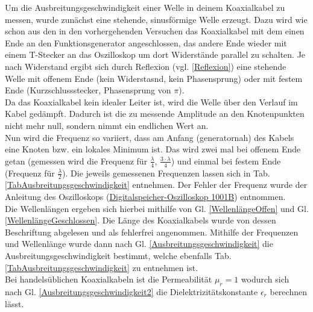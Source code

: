\documentclass[a4paper,10pt,twocolumn]{scrartcl} %
\begin{document}
		Um die Ausbreitungsgeschwindigkeit einer Welle in deinem Koaxialkabel zu messen, wurde zunächst eine stehende, sinusförmige Welle erzeugt.
		Dazu wird wie schon aus den in den vorhergehenden Versuchen das Koaxialkabel mit dem einen Ende an den Funktionsgenerator angeschlossen,
		das andere Ende wieder mit einem T-Stecker an das Oszilloskop um dort Widerstände parallel zu schalten. Je nach Widerstand ergibt sich 
		durch Reflexion (vgl. \ref{Reflexion}) eine stehende Welle mit offenem Ende (kein Widerstasnd, kein Phasensprung) oder mit festem Ende 
		(Kurzschlussstecker, Phasensprung von $\pi$).\\
		Da das Koaxialkabel kein idealer Leiter ist, wird die Welle über den Verlauf im Kabel gedämpft. Dadurch ist die zu messende Amplitude an den 
		Knotenpunkten nicht mehr null, sondern nimmt ein endlichen Wert an. \\
		Nun wird die Frequenz so variiert, dass am Anfang (generatornah) des Kabels eine Knoten bzw. ein lokales Minimum ist. Das wird zwei mal bei
		offenem Ende getan (gemessen wird die Frequenz für $\frac{\lambda}{4}$, $\frac{3\cdot \lambda}{4}$) und einmal bei festem Ende 
		(Frequenz für $\frac{\lambda}{2}$). Die jeweils gemessenen Frequenzen lassen sich in Tab. \ref{TabAusbreitungsgeschwindigkeit} entnehmen. 
		Der Fehler der Frequenz wurde der Anleitung des Oszilloskops (\href{https://www.physik.uni-wuerzburg.de/fileadmin/11000000/03_Studium/02_Bachelor/Grundpraktikum/_imported/fileadmin/11016800/Geraete/Digitalspeicher-Oszilloskop-1001B.pdf}{Digitalspeicher-Oszilloskop 1001B}) entnommen.\\
		Die Wellenlängen ergeben sich hierbei mithilfe von Gl. \ref{WellenlängeOffen} und Gl. \ref{WellenlängeGeschlossen}. Die Länge des Koaxialkabels
		wurde von dessen Beschriftung abgelesen und als fehlerfrei angenommen.
		Mithilfe der Frequenzen und Wellenlänge wurde dann nach Gl. \ref{Ausbreitungsgeschwindigkeit} die Ausbreitungsgeschwindigkeit bestimmt, welche ebenfalls
		Tab. \ref{TabAusbreitungsgeschwindigkeit} zu entnehmen ist. \\
		Bei handelsüblichen Koaxialkabeln ist die Permeabilität $\mu_r = 1$ wodurch sich nach Gl. \ref{Ausbreitungsgeschwindigkeit2} die Dielektrizitätskonstante
		$\epsilon_r$ berechnen lässt.
\end{document}
